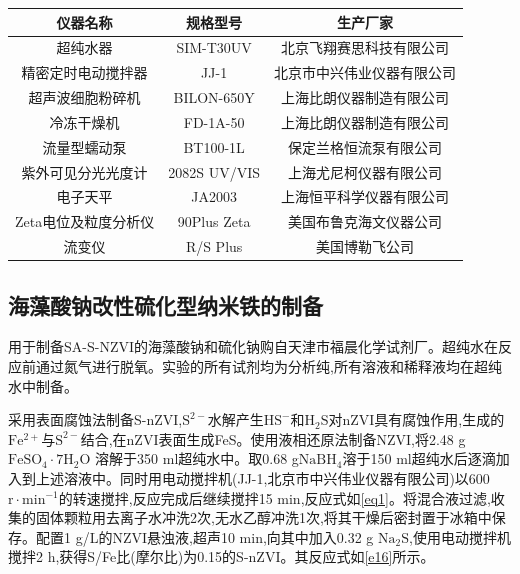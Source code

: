 \begin{table}[h]
	\centering
	\label{tab2}
	\begin{tabular}{@{}ccc@{}}\toprule
		仪器名称&规格型号&生产厂家\\\midrule
        超纯水器&SIM-T30UV&北京飞翔赛思科技有限公司\\
		精密定时电动搅拌器&JJ-1&北京市中兴伟业仪器有限公司\\
        超声波细胞粉碎机&BILON-650Y&上海比朗仪器制造有限公司\\
		冷冻干燥机&FD-1A-50&上海比朗仪器制造有限公司\\
		流量型蠕动泵&BT100-1L&保定兰格恒流泵有限公司\\
		紫外可见分光光度计&2082S UV/VIS&上海尤尼柯仪器有限公司\\
		电子天平&JA2003&上海恒平科学仪器有限公司\\
        Zeta电位及粒度分析仪&90Plus Zeta&美国布鲁克海文仪器公司\\
        流变仪&R/S Plus&美国博勒飞公司\\\bottomrule
	\end{tabular}
\end{table}


\subsection{海藻酸钠改性硫化型纳米铁的制备}\label{material}

用于制备SA-S-NZVI的海藻酸钠和硫化钠购自天津市福晨化学试剂厂。超纯水在反应前通过氮气进行脱氧。实验的所有试剂均为分析纯,所有溶液和稀释液均在超纯水中制备。

采用表面腐蚀法制备S-nZVI,$\mathrm{S^{2-}}$水解产生$\mathrm{HS^-}$和$\mathrm{H_2S}$对nZVI具有腐蚀作用,生成的$\mathrm{Fe^{2+}}$与$\mathrm S^{2-}$结合,在nZVI表面生成FeS\cite{ ISI:000382805800072}。使用液相还原法制备NZVI\cite{2020The,LIU2019124193},将2.48 g$\mathrm{FeSO_4\cdot 7H_2O}$ 溶解于350 ml超纯水中。取0.68 g$\mathrm{NaBH_4}$溶于150 ml超纯水后逐滴加入到上述溶液中。同时用电动搅拌机(JJ-1,北京市中兴伟业仪器有限公司)以600 $\mathrm{r\cdot min^{-1}}$的转速搅拌,反应完成后继续搅拌15 min,反应式如\cref{eq1}。将混合液过滤,收集的固体颗粒用去离子水冲洗2次,无水乙醇冲洗1次,将其干燥后密封置于冰箱中保存。配置1 g/L的NZVI悬浊液,超声10 min,向其中加入0.32 g $\mathrm{{Na}_2S}$,使用电动搅拌机搅拌2 h,获得S/Fe比(摩尔比)为0.15的S-nZVI。其反应式如\cref{e16}所示\cite{ ISI:000355774400014}。

